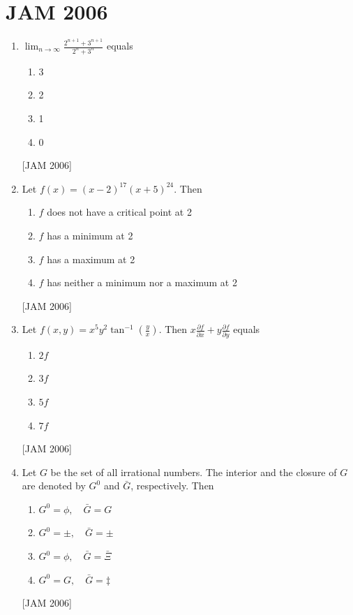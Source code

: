 \newpage

\section{JAM 2006}

\begin{enumerate}
  \item $\lim _{n \rightarrow \infty} \frac{2^{n+1}+3^{n+1}}{2^{n}+3^{n}}$ equals
\begin{enumerate}
    \item 3
    \item  2
    \item  1
    \item 0
\end{enumerate}
 \hfill [JAM 2006]


  \item Let $f(x)=(x-2)^{17}(x+5)^{24}$. Then
  \begin{enumerate}
    \item $f$ does not have a critical point at 2
    \item $f$ has a minimum at 2
    \item $f$ has a maximum at 2
    \item $f$ has neither a minimum nor a maximum at 2
  \end{enumerate}
 \hfill [JAM 2006]


  \item Let $f(x, y)=x^{5} y^{2} \tan ^{-1}\left(\frac{y}{x}\right)$. Then $x \frac{\partial f}{\partial x}+y \frac{\partial f}{\partial y}$ equals
    \begin{enumerate}
\item $2 f$
\item $3 f$
\item $5 f$
\item $7 f$
\end{enumerate}
 \hfill [JAM 2006]
 
  \item Let $G$ be the set of all irrational numbers. The interior and the closure of $G$ are denoted by $G^{0}$ and $\bar{G}$, respectively. Then
  \begin{enumerate}
\item $G^{0}=\phi, \quad \bar{G}=G$
\item $G^{0}=\pm, \quad \bar{G}=\pm$
\item $G^{0}=\phi, \quad \bar{G}=\bar{\Xi}$
\item $G^{0}=G, \quad \bar{G}=\ddagger$ 
\end{enumerate}
 \hfill [JAM 2006]



\end{enumerate}
